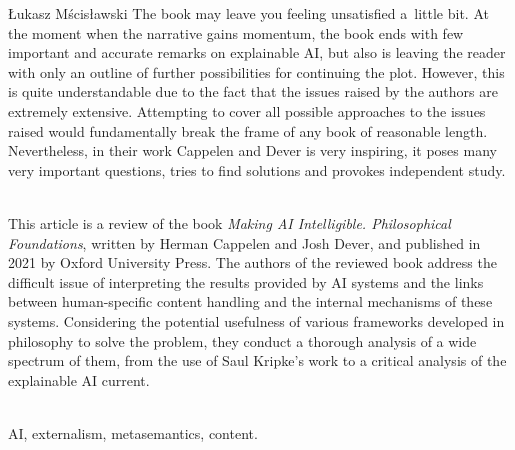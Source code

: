\begin{newrevengenv}{Łukasz Mścisławski}
The book may leave you feeling unsatisfied a~little bit. At the moment when the narrative gains momentum, the book ends with few important and accurate remarks on explainable AI, but also is leaving the reader with only an outline of further possibilities for continuing the plot. However, this is quite understandable due to the fact that the issues raised by the authors are extremely extensive. Attempting to cover all possible approaches to the issues raised would fundamentally break the frame of any book of reasonable length. Nevertheless, in their work Cappelen and Dever is very inspiring, it poses many very important questions, tries to find solutions and provokes independent study.

\vspace{15mm}%
{}\\
{This article is a review of the book \textit{Making AI Intelligible. Philosophical Foundations}, written by Herman Cappelen and Josh Dever, and published in 2021 by Oxford University Press. The authors of the reviewed book address the difficult issue of interpreting the results provided by AI systems and the links between human-specific content handling and the internal mechanisms of these systems. Considering the potential usefulness of various frameworks developed in philosophy to solve the problem, they conduct a thorough analysis of a wide spectrum of them, from the use of Saul Kripke's work to a critical analysis of the explainable AI current.}\par%
\vspace{2mm}%
{}\\
{AI, externalism, metasemantics, content.}%

\end{newrevengenv}